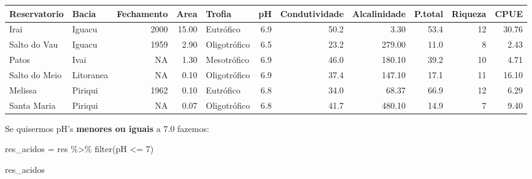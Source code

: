 \documentclass[
]{book}
\newenvironment{Shaded}{\begin{snugshade}}{\end{snugshade}}
\newcommand{\DecValTok}[1]{\textcolor[rgb]{0.00,0.00,0.81}{#1}}
\newcommand{\FunctionTok}[1]{\textcolor[rgb]{0.00,0.00,0.00}{#1}}
\newcommand{\NormalTok}[1]{#1}
\newcommand{\OtherTok}[1]{\textcolor[rgb]{0.56,0.35,0.01}{#1}}
\newcommand{\SpecialCharTok}[1]{\textcolor[rgb]{0.00,0.00,0.00}{#1}}
\begin{document}
\begin{table}
\centering\begingroup\fontsize{8}{10}\selectfont

\begin{tabular}{llrrlrrrrrr}
\toprule
Reservatorio & Bacia & Fechamento & Area & Trofia & pH & Condutividade & Alcalinidade & P.total & Riqueza & CPUE\\
\midrule
Irai & Iguacu & 2000 & 15.00 & Eutrófico & 6.9 & 50.2 & 3.30 & 53.4 & 12 & 30.76\\
Salto do Vau & Iguacu & 1959 & 2.90 & Oligotrófico & 6.5 & 23.2 & 279.00 & 11.0 & 8 & 2.43\\
Patos & Ivai & NA & 1.30 & Mesotrófico & 6.9 & 46.0 & 180.10 & 39.2 & 10 & 4.71\\
Salto do Meio & Litoranea & NA & 0.10 & Oligotrófico & 6.9 & 37.4 & 147.10 & 17.1 & 11 & 16.10\\
Melissa & Piriqui & 1962 & 0.10 & Eutrófico & 6.8 & 34.0 & 68.37 & 66.9 & 12 & 6.29\\
\addlinespace
Santa Maria & Piriqui & NA & 0.07 & Oligotrófico & 6.8 & 41.7 & 480.10 & 14.9 & 7 & 9.40\\
\bottomrule
\end{tabular}
\endgroup{}
\end{table}

Se quisermos pH's \textbf{menores ou iguais} a \(7.0\) fazemos:

\begin{Shaded}
\begin{Highlighting}[]
\NormalTok{res\_acidos }\OtherTok{=}\NormalTok{ res }\SpecialCharTok{\%\textgreater{}\%} 
  \FunctionTok{filter}\NormalTok{(pH }\SpecialCharTok{\textless{}=} \DecValTok{7}\NormalTok{)}

\NormalTok{res\_acidos}
\end{Highlighting}
\end{Shaded}
\end{document}
